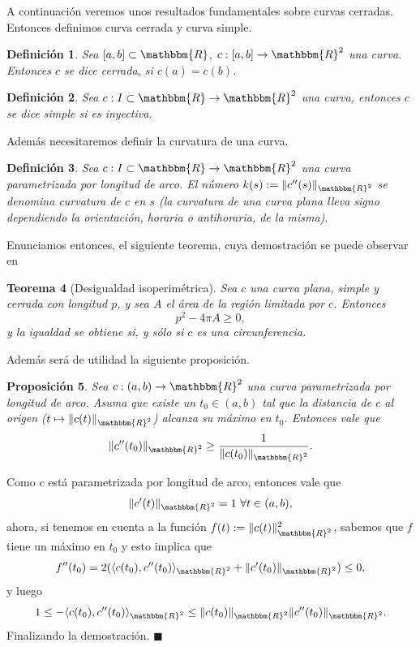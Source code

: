 \documentclass[a4paper,10pt]{book}
\newcommand{\R}{\mathbbm{R}}
\newcommand{\arr}{\rightarrow}
\newcommand{\la}{\langle}
\newcommand{\ra}{\rangle}
\newtheorem{teo}{Teorema}[section]
\newtheorem{prop}[teo]{Proposici\'on}
\newtheorem{defi}[teo]{Definici\'on}
\newenvironment{dem}{\vspace*{-0.1cm}{\it Demostraci\'on:}}{\hfill
$\blacksquare$\\}
\begin{document}
A continuación veremos unos resultados fundamentales sobre curvas cerradas. Entonces definimos curva cerrada y curva simple.

\begin{defi}
 Sea $[a,b]\subset\R$, $c:[a,b]\arr\R^2$ una curva. Entonces $c$ se dice cerrada, si $c(a)=c(b)$. 
\end{defi}

\begin{defi}\label{curvasimple}
Sea $c:I\subset\R\arr\R^2$ una curva, entonces $c$ se dice simple si es inyectiva.
\end{defi}

Además necesitaremos definir la curvatura de una curva.

\begin{defi}
Sea $c:I\subset\R\arr\R^2$ una curva parametrizada por longitud de arco. El número $k(s):=\|c''(s)\|_{\R^2}$ se denomina curvatura de $c$ en $s$ (la curvatura de una curva plana lleva signo dependiendo la orientación, horaria o antihoraria, de la misma).
\end{defi}

Enunciamos entonces, el siguiente teorema, cuya demostración se puede observar en \cite[Theorem 1, pg 33-35]{do1990geometria}

\begin{teo}[Desigualdad isoperimétrica]\label{desigualdadisoperimetrica}
Sea $c$ una curva plana, simple y cerrada con longitud $p$, y sea $A$ el área de la región limitada por $c$. Entonces
\begin{equation*}
    p^2-4\pi A\geq0,
\end{equation*}
y la igualdad se obtiene si, y sólo si $c$ es una circunferencia.
\end{teo}

Además será de utilidad la siguiente proposición.

\begin{prop}\label{cotainfcurvatura}
 Sea $c:(a,b)\arr\R^2$ una curva parametrizada por longitud de arco. Asuma que existe un $t_0\in(a,b)$ tal que la distancia de $c$ al origen ($t\mapsto\|c(t)\|_{\R^2}$) alcanza su máximo en $t_0$. Entonces vale que 
 $$\|c''(t_0)\|_{\R^2}\geq\frac{1}{\|c(t_0)\|_{\R^2}}.$$
\end{prop}

\begin{dem}
Como $c$ está parametrizada por longitud de arco, entonces vale que $$\|c'(t)\|_{\R^2}=1\ \forall t\in(a,b),$$
ahora, si tenemos en cuenta a la función $f(t):=\|c(t)\|^2_{\R^2}$, sabemos que $f$ tiene un máximo en $t_0$ y esto implica que $$f''(t_0)=2(\la c(t_0),c''(t_0)\ra_{\R^2}+\|c'(t_0)\|_{\R^2})\leq 0,$$
y luego $$1\leq-\la c(t_0),c''(t_0)\ra_{\R^2}\leq\|c(t_0)\|_{\R^2}\|c''(t_0)\|_{\R^2}.$$
Finalizando la demostración.
\end{dem}
\end{document}
